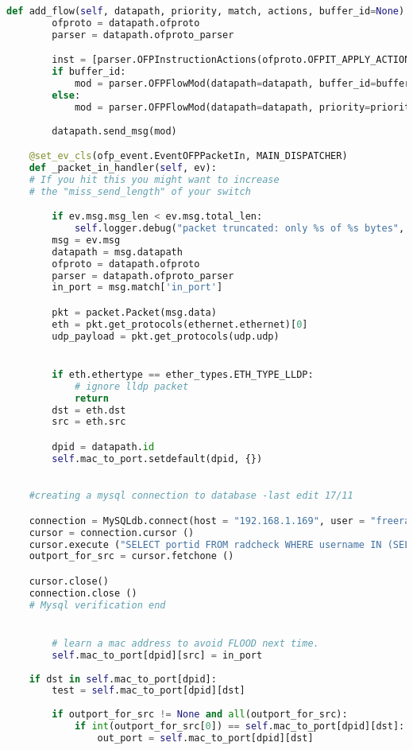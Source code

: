 \begin{lstlisting}[language = Python, caption={The User Segregation Mac Learning Application}, label={lst:userseg-code}]
	def add_flow(self, datapath, priority, match, actions, buffer_id=None):
		ofproto = datapath.ofproto
		parser = datapath.ofproto_parser

		inst = [parser.OFPInstructionActions(ofproto.OFPIT_APPLY_ACTIONS, actions)]
		if buffer_id: 
			mod = parser.OFPFlowMod(datapath=datapath, buffer_id=buffer_i , priority=priority, match=match, instructions=inst)
		else:
			mod = parser.OFPFlowMod(datapath=datapath, priority=priority, match=match, instructions=inst)
			
		datapath.send_msg(mod)

	@set_ev_cls(ofp_event.EventOFPPacketIn, MAIN_DISPATCHER)
	def _packet_in_handler(self, ev):
	# If you hit this you might want to increase
	# the "miss_send_length" of your switch

		if ev.msg.msg_len < ev.msg.total_len:
			self.logger.debug("packet truncated: only %s of %s bytes", ev.msg.msg_len, ev.msg.total_len)
		msg = ev.msg
		datapath = msg.datapath
		ofproto = datapath.ofproto
		parser = datapath.ofproto_parser
		in_port = msg.match['in_port']

		pkt = packet.Packet(msg.data)
		eth = pkt.get_protocols(ethernet.ethernet)[0]
		udp_payload = pkt.get_protocols(udp.udp)


		if eth.ethertype == ether_types.ETH_TYPE_LLDP:
			# ignore lldp packet
			return
		dst = eth.dst
		src = eth.src

		dpid = datapath.id
		self.mac_to_port.setdefault(dpid, {})
	

	#creating a mysql connection to database -last edit 17/11

	connection = MySQLdb.connect(host = "192.168.1.169", user = "freerad", passwd = "pass", db = "radius")
	cursor = connection.cursor ()
	cursor.execute ("SELECT portid FROM radcheck WHERE username IN (SELECT user FROM radpostauth WHERE CallingStationId = %s AND id = (SELECT MAX(id) from radpostauth) )", src)
	outport_for_src = cursor.fetchone ()

	cursor.close()
	connection.close ()
	# Mysql verification end


		# learn a mac address to avoid FLOOD next time.
		self.mac_to_port[dpid][src] = in_port
	
	if dst in self.mac_to_port[dpid]:
		test = self.mac_to_port[dpid][dst]
		
		if outport_for_src != None and all(outport_for_src):
			if int(outport_for_src[0]) == self.mac_to_port[dpid][dst]:
				out_port = self.mac_to_port[dpid][dst]


\end{lstlisting}
